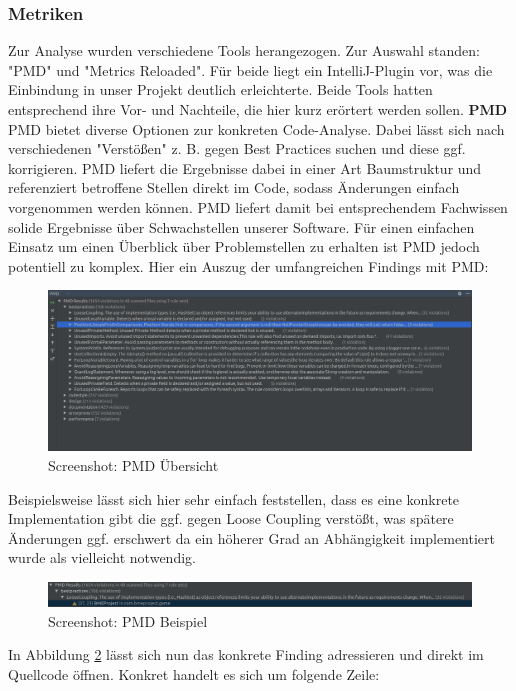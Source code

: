 \subsubsection{Metriken}
Zur Analyse wurden verschiedene Tools herangezogen. Zur Auswahl standen: "PMD" und "Metrics Reloaded". Für beide liegt ein IntelliJ-Plugin vor, was die Einbindung in unser Projekt deutlich erleichterte. Beide Tools hatten entsprechend ihre Vor- und Nachteile, die hier kurz erörtert werden sollen.
\textbf{PMD}
PMD bietet diverse Optionen zur konkreten Code-Analyse. Dabei lässt sich nach verschiedenen "Verstößen" z. B. gegen Best Practices suchen und diese ggf. korrigieren. PMD liefert die Ergebnisse dabei in einer Art Baumstruktur und referenziert betroffene Stellen direkt im Code, sodass Änderungen einfach vorgenommen werden können. PMD liefert damit bei entsprechendem Fachwissen solide Ergebnisse über Schwachstellen unserer Software. Für einen einfachen Einsatz um einen Überblick über Problemstellen zu erhalten ist PMD jedoch potentiell zu komplex. 
Hier ein Auszug der umfangreichen Findings mit PMD:
\begin{figure}
\includegraphics[width=1\textwidth]{../img/sq/pmd1.PNG}
\caption{Screenshot: PMD Übersicht}
\label{fig:Screenshot PMD Übersicht}
\end{figure}
Beispielsweise lässt sich hier sehr einfach feststellen, dass es eine konkrete Implementation gibt die ggf. gegen Loose Coupling verstößt, was spätere Änderungen ggf. erschwert da ein höherer Grad an Abhängigkeit implementiert wurde als vielleicht notwendig. 
\begin{figure}
\includegraphics[width=1\textwidth]{../img/sq/pmd2.PNG}
\caption{Screenshot: PMD Beispiel}
\label{fig:Screenshot PMD Beispiel}
\end{figure}
In Abbildung \ref{fig:Screenshot PMD Beispiel} lässt sich nun das konkrete Finding adressieren und direkt im Quellcode öffnen. Konkret handelt es sich um folgende Zeile:
